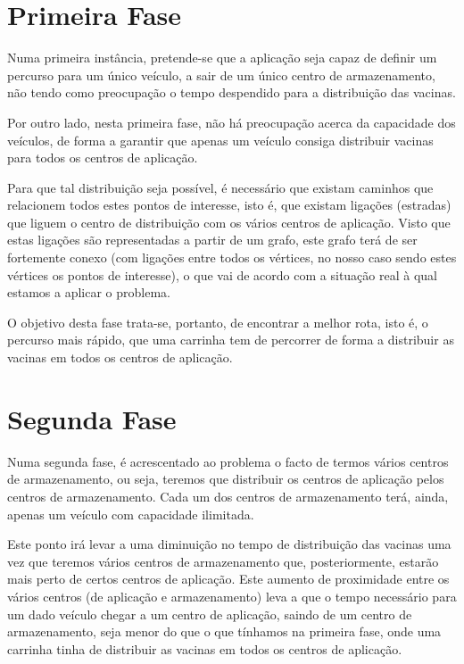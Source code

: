 \documentclass[12pt,a4paper]{report}
\begin{document}
	\section{Primeira Fase}
	Numa primeira instância, pretende-se que a aplicação seja capaz de definir um percurso para um único veículo, a sair de um único centro de armazenamento, não tendo como preocupação o tempo despendido para a distribuição das vacinas. \par
	Por outro lado, nesta primeira fase, não há preocupação acerca da capacidade dos veículos, de forma a garantir que apenas um veículo consiga distribuir vacinas para  todos os centros de aplicação. \par
	Para que tal distribuição seja possível, é necessário que existam caminhos que relacionem todos estes pontos de interesse, isto é, que existam ligações (estradas) que liguem o centro de distribuição com os vários centros de aplicação. Visto que estas ligações são representadas a partir de um grafo, este grafo terá de ser fortemente conexo (com ligações entre todos os vértices, no nosso caso sendo estes vértices os pontos de interesse), o que vai de acordo com a situação real à qual estamos a aplicar o problema. \par
	O objetivo desta fase trata-se, portanto, de encontrar a melhor rota, isto é, o percurso mais rápido, que uma carrinha tem de percorrer de forma a distribuir as vacinas em todos os centros de aplicação.

	\section{Segunda Fase}
	Numa segunda fase, é acrescentado ao problema o facto de termos vários centros de armazenamento, ou seja, teremos que distribuir os centros de aplicação pelos centros de armazenamento. Cada um dos centros de armazenamento terá, ainda, apenas um veículo com capacidade ilimitada. \par
	Este ponto irá levar a uma diminuição no tempo de distribuição das vacinas uma vez que teremos vários centros de armazenamento que, posteriormente, estarão mais perto de certos centros de aplicação. Este aumento de proximidade entre os vários centros (de aplicação e armazenamento) leva a que o tempo necessário para um dado veículo chegar a um centro de aplicação, saindo de um centro de armazenamento, seja menor do que o que tínhamos na primeira fase, onde uma carrinha tinha de distribuir as vacinas em todos os centros de aplicação.
\end{document}

